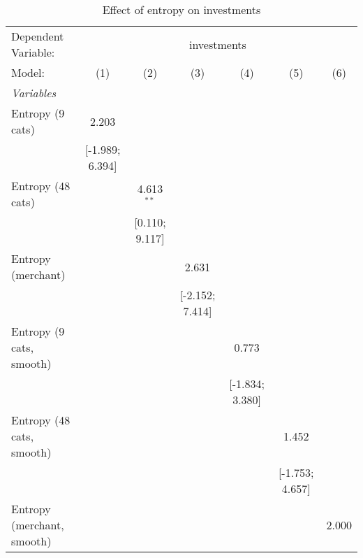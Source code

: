 
\begin{table}[htbp]
   \centering
   \tiny
   \begin{threeparttable}[b]
      \caption{\label{tab:reg_investments} Effect of entropy on investments}
      \begin{tabular}{lcccccc}
         \tabularnewline \midrule \midrule
         Dependent Variable: & \multicolumn{6}{c}{investments}\\
         Model:                     & (1)              & (2)              & (3)              & (4)              & (5)              & (6)\\  
         \midrule
         \emph{Variables}\\
         Entropy (9 cats)           & 2.203            &                  &                  &                  &                  &   \\   
                                    & [-1.989; 6.394]  &                  &                  &                  &                  &   \\   
         Entropy (48 cats)          &                  & 4.613$^{**}$     &                  &                  &                  &   \\   
                                    &                  & [0.110; 9.117]   &                  &                  &                  &   \\   
         Entropy (merchant)         &                  &                  & 2.631            &                  &                  &   \\   
                                    &                  &                  & [-2.152; 7.414]  &                  &                  &   \\   
         Entropy (9 cats, smooth)   &                  &                  &                  & 0.773            &                  &   \\   
                                    &                  &                  &                  & [-1.834; 3.380]  &                  &   \\   
         Entropy (48 cats, smooth)  &                  &                  &                  &                  & 1.452            &   \\   
                                    &                  &                  &                  &                  & [-1.753; 4.657]  &   \\   
         Entropy (merchant, smooth) &                  &                  &                  &                  &                  & 2.000\\   

\end{tabular}
\end{threeparttable}
\end{table}
